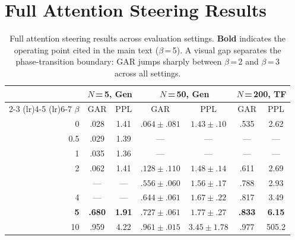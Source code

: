 \section{Full Attention Steering Results}\label{sec:appendix-steering}

\begin{table}[t]
\centering\small
\caption{Full attention steering results across evaluation settings.
\textbf{Bold} indicates the operating point cited in the main text ($\beta$\,=\,5).
A visual gap separates the phase-transition boundary: GAR jumps sharply between $\beta$\,=\,2 and $\beta$\,=\,3 across all settings.}
\label{tab:steering-full}
\begin{tabular}{r cc cc cc}
\toprule
 & \multicolumn{2}{c}{\textbf{$N$\,=\,5, Gen}} & \multicolumn{2}{c}{\textbf{$N$\,=\,50, Gen}} & \multicolumn{2}{c}{\textbf{$N$\,=\,200, TF}} \\
\cmidrule(lr){2-3} \cmidrule(lr){4-5} \cmidrule(lr){6-7}
$\beta$ & GAR & PPL & GAR & PPL & GAR & PPL \\
\midrule
0   & .028 & 1.41 & $.064 \pm .081$ & $1.43 \pm .10$ & .535 & 2.62 \\
0.5 & .029 & 1.39 & ---             & ---             & ---  & ---  \\
1   & .035 & 1.36 & ---             & ---             & ---  & ---  \\
2   & .062 & 1.41 & $.128 \pm .110$ & $1.48 \pm .14$ & .611 & 2.69 \\
\addlinespace[3pt]
3   & ---  & ---  & $.556 \pm .060$ & $1.56 \pm .17$ & .788 & 2.93 \\
4   & ---  & ---  & $.644 \pm .061$ & $1.67 \pm .22$ & .817 & 3.49 \\
\textbf{5}  & \textbf{.680} & \textbf{1.91} & $\mathbf{.727 \pm .061}$ & $\mathbf{1.77 \pm .27}$ & \textbf{.833} & \textbf{6.15} \\
10  & .959 & 4.22 & $.961 \pm .015$ & $3.45 \pm 1.78$ & .977 & 505.2 \\
\bottomrule
\end{tabular}
\end{table}
